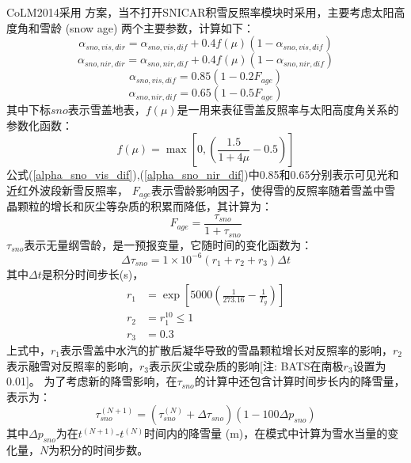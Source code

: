 CoLM2014采用 \citet{dickinson1986biosphere} 方案，当不打开SNICAR积雪反照率模块时采用，主要考虑太阳高度角和雪龄 (snow age) 两个主要参数，计算如下：
\begin{equation}
\alpha_{sno, vis, dir}=\alpha_{sno, vis, dif}+0.4 f(\mu)\left(1-\alpha_{sno, vis, dif}\right)
\end{equation}
%
\begin{equation}
\alpha_{sno,nir,dir}=\alpha_{sno, nir, dif}+0.4 f(\mu)\left(1-\alpha_{sno,nir,dif}\right)
\end{equation} 
%
\begin{equation}\label{alpha_sno_vis_dif}
\alpha_{sno,vis,dif}=0.85\left(1-0.2 F_{age}\right)
\end{equation}
%
\begin{equation}\label{alpha_sno_nir_dif}
\alpha_{sno,nir,dif}=0.65\left(1-0.5 F_{age}\right)
\end{equation}
其中下标$sno$表示雪盖地表，$f(\mu)$是一用来表征雪盖反照率与太阳高度角关系的参数化函数：
\begin{equation}\label{fmu}
f(\mu)=\max\left[0,\left(\frac{1.5}{1+4 \mu}-0.5\right)\right]
\end{equation}
公式(\ref{alpha_sno_vis_dif}),(\ref{alpha_sno_nir_dif})中0.85和0.65分别表示可见光和近红外波段新雪反照率，
$F_{age}$表示雪龄影响因子，使得雪的反照率随着雪盖中雪晶颗粒的增长和灰尘等杂质的积累而降低，其计算为：
\begin{equation}
F_{a g e}=\frac{\tau_{sno}}{1+\tau_{sno}}
\end{equation}
$\tau_{sno}$表示无量纲雪龄，是一预报变量，它随时间的变化函数为：
\begin{equation}
\Delta \tau_{sno}=1 \times 10^{-6}\left(r_{1}+r_{2}+r_{3}\right) \Delta t
\end{equation}
其中$\Delta t$是积分时间步长(s)，
\begin{align}
r_{1} &= \exp \left[5000\left(\frac{1}{273.16}-\frac{1}{T_{g}}\right)\right] \\
r_{2} &= r_{1}^{10} \leq 1 \\
r_{3} &= 0.3
\end{align}
上式中，$r_1$表示雪盖中水汽的扩散后凝华导致的雪晶颗粒增长对反照率的影响，$r_2$表示融雪对反照率的影响，$r_3$表示灰尘或杂质的影响[注: BATS在南极$r_3$设置为0.01]。
为了考虑新的降雪影响，在$\tau_{sno}$的计算中还包含计算时间步长内的降雪量，表示为：
\begin{equation}
\tau_{sno}^{(N+1)}=\left(\tau_{sno}^{(N)}+\Delta \tau_{sno}\right)\left(1-100 \Delta p_{sno}\right)
\end{equation}
其中$\Delta p_{sno}$为在$t^{(N+1)}$-$t^{(N)}$时间内的降雪量 (m)，在模式中计算为雪水当量的变化量，$N$为积分的时间步数。


